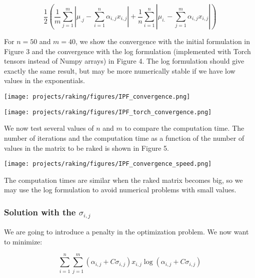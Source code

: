 \begin{equation*}
\frac{1}{2} \left( \frac{1}{m} \sum_{j = 1}^m \left\vert \mu_{.j} - \sum_{i = 1}^n \alpha_{i,j} x_{i,j} \right\vert + \frac{1}{n} \sum_{i = 1}^n \left\vert \mu_{i.} - \sum_{j = 1}^m \alpha_{i,j} x_{i,j} \right\vert \right)
\end{equation*}

For $n = 50$ and $m = 40$, we show the convergence with the initial formulation in Figure 3 and the convergence with the log formulation (implemented with Torch tensors instead of Numpy arrays) in Figure 4. The log formulation should give exactly the same result, but may be more numerically stable if we have low values in the exponentials.

\texttt{[image: projects/raking/figures/IPF\_convergence.png]}

\texttt{[image: projects/raking/figures/IPF\_torch\_convergence.png]}

We now test several values of $n$ and $m$ to compare the computation time. The number of iterations and the computation time as a function of the number of values in  the matrix to be raked is shown in Figure 5.

\texttt{[image: projects/raking/figures/IPF\_convergence\_speed.png]}

The computation times are similar when the raked matrix becomes big, so we may use the log formulation to avoid numerical problems with small values.

\subsubsection{Solution with the $\sigma_{i,j}$}

We are going to introduce a penalty in the optimization problem. We now want to minimize:

\begin{equation*}
\sum_{i = 1}^n \sum_{j = 1}^m \left( \alpha_{i,j} + C \sigma_{i,j} \right) x_{i,j} \log \left( \alpha_{i,j} + C \sigma_{i,j} \right)
\end{equation*}


